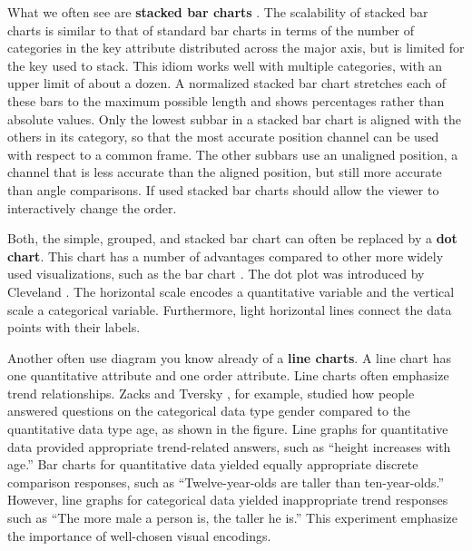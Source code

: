 \documentclass[
]{book}
\begin{document}
What we often see are \textbf{stacked bar charts} \citep{munzner2014visualization}. The scalability of stacked bar charts is similar to that of standard bar charts in terms of the number of categories in the key attribute distributed across the major axis, but is limited for the key used to stack. This idiom works well with multiple categories, with an upper limit of about a dozen. A normalized stacked bar chart stretches each of these bars to the maximum possible length and shows percentages rather than absolute values. Only the lowest subbar in a stacked bar chart is aligned with the others in its category, so that the most accurate position channel can be used with respect to a common frame. The other subbars use an unaligned position, a channel that is less accurate than the aligned position, but still more accurate than angle comparisons. If used stacked bar charts should allow the viewer to interactively change the order.

Both, the simple, grouped, and stacked bar chart can often be replaced by a \textbf{dot chart}. This chart has a number of advantages compared to other more widely used visualizations, such as the bar chart \citep{Soenning2016dotplot}. The dot plot was introduced by Cleveland \citep{ClevelandMcGill1984graphicalperception}. The horizontal scale encodes a quantitative variable and the vertical scale a categorical variable. Furthermore, light horizontal lines connect the data points with their labels.

Another often use diagram you know already of a \textbf{line charts}. A line chart has one quantitative attribute and one order attribute. Line charts often emphasize trend relationships. Zacks and Tversky \citep{ZacksTversky1999linechartbarchart}, for example, studied how people answered questions on the categorical data type gender compared to the quantitative data type age, as shown in the figure. Line graphs for quantitative data provided appropriate trend-related answers, such as ``height increases with age.'' Bar charts for quantitative data yielded equally appropriate discrete comparison responses, such as ``Twelve-year-olds are taller than ten-year-olds.'' However, line graphs for categorical data yielded inappropriate trend responses such as ``The more male a person is, the taller he is.'' This experiment emphasize the importance of well-chosen visual encodings.
\end{document}
